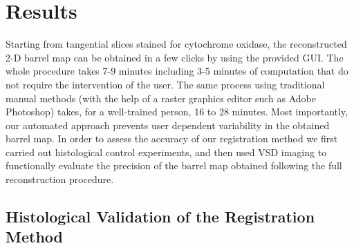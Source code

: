 
\section{Results}
\label{sec-results}

Starting from tangential slices stained for cytochrome oxidase, the reconstructed 2-D barrel map can be obtained in a few clicks by using the provided GUI. The whole procedure takes 7-9 minutes including 3-5 minutes of computation that do not require the intervention of the user. The same process using traditional manual methods (with the help of a raster graphics editor such as Adobe Photoshop) takes, for a well-trained person, 16 to 28 minutes. Most importantly, our automated approach prevents user dependent variability in the obtained barrel map.
In order to assess the accuracy of our registration method we first carried out histological control experiments, and then used VSD imaging to functionally evaluate the precision of the barrel map obtained following the full reconstruction procedure.


\subsection{Histological Validation of the Registration Method}

